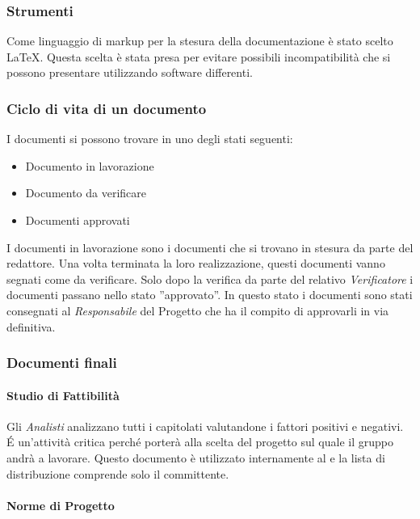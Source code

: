 \subsubsection{Strumenti}

Come linguaggio di markup per la stesura della documentazione  è stato
scelto \LaTeX. Questa scelta è stata presa per evitare possibili
incompatibilità che si possono presentare utilizzando software
differenti. 

\subsubsection{Ciclo di vita di un documento}

I documenti si possono trovare in uno degli stati seguenti:
\begin{itemize}
\item Documento in lavorazione
\item Documento da verificare
\item Documenti approvati
\end{itemize}

I documenti in lavorazione sono i documenti che si trovano in stesura
da parte del redattore. Una volta terminata la loro realizzazione,
questi documenti vanno segnati come da verificare.
Solo dopo la verifica da parte 
del relativo  \emph{Verificatore}  i documenti passano nello stato 
''approvato''. In questo stato i documenti sono stati consegnati al
 \emph{Responsabile}  del Progetto che ha il compito di approvarli in via
definitiva. 

\subsubsection{Documenti finali}

\paragraph{Studio di Fattibilità } 
Gli \emph{Analisti} analizzano tutti i capitolati valutandone
i fattori positivi e negativi. \'E un'attività critica perché porterà alla scelta del 
progetto sul quale il gruppo andrà a lavorare.  Questo
documento è utilizzato internamente al  e la lista di
distribuzione comprende solo il committente. 

\paragraph{Norme di Progetto }

